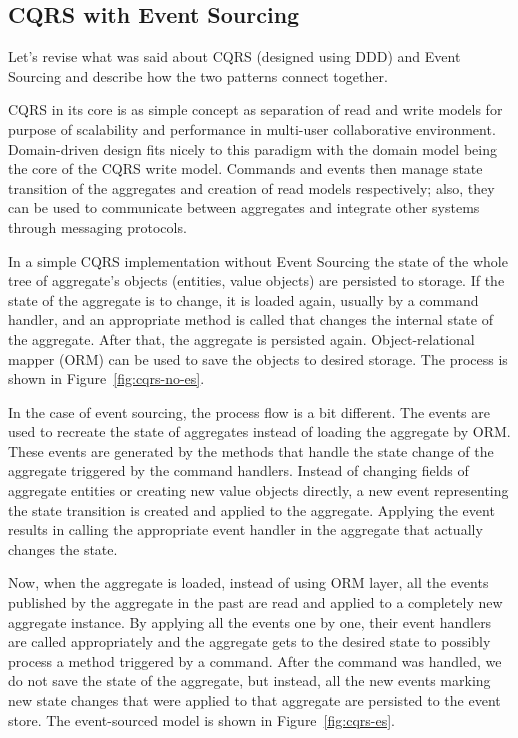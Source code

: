 \documentclass{book}
\begin{document}
\subsection{CQRS with Event Sourcing}\label{cqrs-with-event-sourcing}

Let's revise what was said about CQRS (designed using DDD) and Event
Sourcing and describe how the two patterns connect together.

CQRS in its core is as simple concept as separation of read and write
models for purpose of scalability and performance in multi-user
collaborative environment. Domain-driven design fits nicely to this
paradigm with the domain model being the core of the CQRS write model.
Commands and events then manage state transition of the aggregates and
creation of read models respectively; also, they can be used to
communicate between aggregates and integrate other systems through
messaging protocols.

In a simple CQRS implementation without Event Sourcing the state of the
whole tree of aggregate's objects (entities, value objects) are
persisted to storage. If the state of the aggregate is to change, it is
loaded again, usually by a command handler, and an appropriate method is
called that changes the internal state of the aggregate. After that, the
aggregate is persisted again. Object-relational mapper (ORM) can be used
to save the objects to desired storage. The process is shown in Figure~\ref{fig:cqrs-no-es}.

In the case of event sourcing, the process flow is a bit different. The
events are used to recreate the state of aggregates instead of loading
the aggregate by ORM. These events are generated by the methods that
handle the state change of the aggregate triggered by the command
handlers. Instead of changing fields of aggregate entities or creating
new value objects directly, a new event representing the state
transition is created and applied to the aggregate. Applying the event
results in calling the appropriate event handler in the aggregate that
actually changes the state.

Now, when the aggregate is loaded, instead of using ORM layer, all the
events published by the aggregate in the past are read and applied to a
completely new aggregate instance. By applying all the events one by
one, their event handlers are called appropriately and the aggregate
gets to the desired state to possibly process a method triggered by a
command. After the command was handled, we do not save the state of the
aggregate, but instead, all the new events marking new state changes
that were applied to that aggregate are persisted to the event store.
The event-sourced model is shown in Figure~\ref{fig:cqrs-es}.
\end{document}
